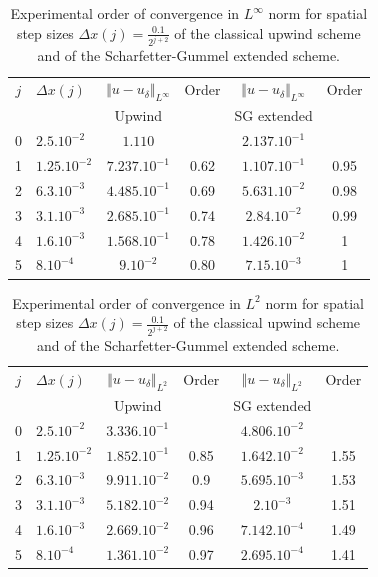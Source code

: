 \documentclass[smallextended]{svjour3}
\newcommand{\ds}{\displaystyle}
\begin{document}
\begin{table}[!ht]
\centering
\begin{tabular}{|c|l|c|c|c|c|}
\hline $j$ & $\Delta x(j)$ & $\Vert u-u_{\delta} \Vert_{L^{\infty}}$  & Order & $\Vert u-u_{\delta} \Vert_{L^{\infty}}$ & Order \\ 
  &  & Upwind &  & SG extended &  \\ 
\hline 0 & $ 2.5.10^{-2}  $   & $ 1.110         $  &      & $ 2.137.10^{-1} $  &   \\ 
       1 & $ 1.25.10^{-2} $   & $ 7.237.10^{-1} $  & 0.62 & $ 1.107.10^{-1} $  & 0.95  \\ 
       2 & $ 6.3.10^{-3}  $   & $ 4.485.10^{-1} $  & 0.69 & $ 5.631.10^{-2} $  & 0.98 \\ 
       3 & $ 3.1.10^{-3}  $   & $ 2.685.10^{-1} $  & 0.74 & $ 2.84.10^{-2}  $  & 0.99  \\ 
       4 & $ 1.6.10^{-3}  $   & $ 1.568.10^{-1} $  & 0.78 & $ 1.426.10^{-2} $  & 1  \\
       5 & $ 8.10^{-4}    $   & $ 9.10^{-2}     $  & 0.80 & $ 7.15.10^{-3}  $  & 1  \\
\hline
\end{tabular} 
\caption{Experimental order of convergence in $L^{\infty}$ norm for spatial step sizes $ \Delta x(j)=\ds{\frac{0.1}{2^{j+2}}}$ of the classical upwind scheme and of the Scharfetter-Gummel extended scheme.}
\label{tableconvergenceinf}
\end{table}
   
   
\begin{table}[!ht]
\centering
\begin{tabular}{|c|l|c|c|c|c|}
\hline $j$ & $\Delta x(j)$ & $\Vert u-u_{\delta} \Vert_{L^{2}}$  & Order & $\Vert u-u_{\delta} \Vert_{L^{2}}$ & Order \\ 
  &  & Upwind &  & SG extended &  \\ 
\hline 0 & $ 2.5.10^{-2}  $   & $ 3.336.10^{-1} $  &      & $ 4.806.10^{-2} $  &   \\ 
       1 & $ 1.25.10^{-2} $   & $ 1.852.10^{-1} $  & 0.85 & $ 1.642.10^{-2} $  & 1.55  \\ 
       2 & $ 6.3.10^{-3}  $   & $ 9.911.10^{-2} $  & 0.9  & $ 5.695.10^{-3} $  & 1.53 \\ 
       3 & $ 3.1.10^{-3}  $   & $ 5.182.10^{-2} $  & 0.94 & $ 2.10^{-3}     $  & 1.51  \\ 
       4 & $ 1.6.10^{-3}  $   & $ 2.669.10^{-2} $  & 0.96 & $ 7.142.10^{-4} $  & 1.49  \\
       5 & $ 8.10^{-4}    $   & $ 1.361.10^{-2} $  & 0.97 & $ 2.695.10^{-4} $  & 1.41  \\
\hline
\end{tabular} 
\caption{Experimental order of convergence in $L^{2}$ norm for spatial step sizes $ \Delta x(j)=\ds{\frac{0.1}{2^{j+2}}}$ of the classical upwind scheme and of the Scharfetter-Gummel extended scheme.}
\label{tableconvergence2}
\end{table}
\end{document}
